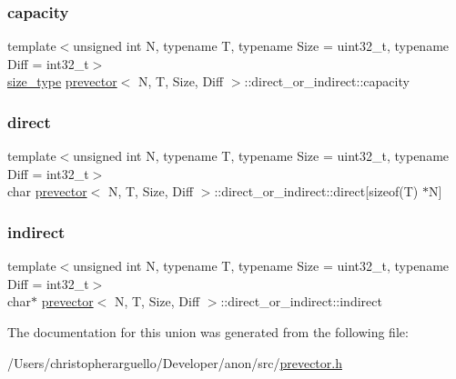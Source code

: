 \subsubsection{\texorpdfstring{capacity}{capacity}}
{\footnotesize\ttfamily template$<$unsigned int N, typename T, typename Size = uint32\+\_\+t, typename Diff = int32\+\_\+t$>$ \\
\mbox{\hyperlink{classprevector_a7e0da95e6d1c878f6eeb572f4fc12524}{size\+\_\+type}} \mbox{\hyperlink{classprevector}{prevector}}$<$ N, T, Size, Diff $>$\+::direct\+\_\+or\+\_\+indirect\+::capacity}

\mbox{\label{unionprevector_1_1direct__or__indirect_accf7da4788eeb76fff71273789bb78e5}} 
\subsubsection{\texorpdfstring{direct}{direct}}
{\footnotesize\ttfamily template$<$unsigned int N, typename T, typename Size = uint32\+\_\+t, typename Diff = int32\+\_\+t$>$ \\
char \mbox{\hyperlink{classprevector}{prevector}}$<$ N, T, Size, Diff $>$\+::direct\+\_\+or\+\_\+indirect\+::direct\mbox{[}sizeof(T) $\ast$N\mbox{]}}

\mbox{\label{unionprevector_1_1direct__or__indirect_a1c80825c1780b32f20caf1b098a17557}} 
\subsubsection{\texorpdfstring{indirect}{indirect}}
{\footnotesize\ttfamily template$<$unsigned int N, typename T, typename Size = uint32\+\_\+t, typename Diff = int32\+\_\+t$>$ \\
char$\ast$ \mbox{\hyperlink{classprevector}{prevector}}$<$ N, T, Size, Diff $>$\+::direct\+\_\+or\+\_\+indirect\+::indirect}



The documentation for this union was generated from the following file\+:\begin{DoxyCompactItemize}
\item 
/\+Users/christopherarguello/\+Developer/anon/src/\mbox{\hyperlink{prevector_8h}{prevector.\+h}}\end{DoxyCompactItemize}
